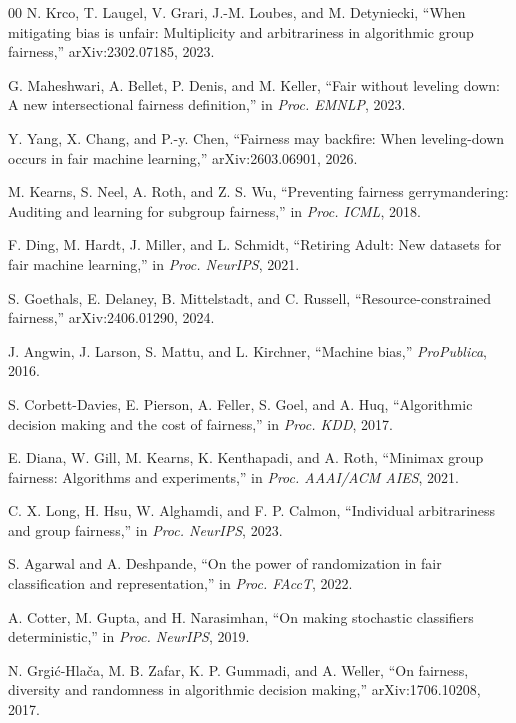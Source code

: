 \documentclass[conference]{IEEEtran}
\begin{document}
\begin{thebibliography}{00}
 N. Krco, T. Laugel, V. Grari, J.-M. Loubes, and M. Detyniecki, ``When
mitigating bias is unfair: Multiplicity and arbitrariness in algorithmic group fairness,''
arXiv:2302.07185, 2023.

 G. Maheshwari, A. Bellet, P. Denis, and M. Keller, ``Fair without
leveling down: A new intersectional fairness definition,'' in \emph{Proc. EMNLP}, 2023.

 Y. Yang, X. Chang, and P.-y. Chen, ``Fairness may backfire: When
leveling-down occurs in fair machine learning,'' arXiv:2603.06901, 2026.

 M. Kearns, S. Neel, A. Roth, and Z. S. Wu, ``Preventing fairness
gerrymandering: Auditing and learning for subgroup fairness,'' in \emph{Proc. ICML}, 2018.

 F. Ding, M. Hardt, J. Miller, and L. Schmidt, ``Retiring Adult: New datasets
for fair machine learning,'' in \emph{Proc. NeurIPS}, 2021.

 S. Goethals, E. Delaney, B. Mittelstadt, and C. Russell,
``Resource-constrained fairness,'' arXiv:2406.01290, 2024.

 J. Angwin, J. Larson, S. Mattu, and L. Kirchner, ``Machine bias,''
\emph{ProPublica}, 2016.

 S. Corbett-Davies, E. Pierson, A. Feller, S. Goel, and A. Huq,
``Algorithmic decision making and the cost of fairness,'' in \emph{Proc. KDD}, 2017.

 E. Diana, W. Gill, M. Kearns, K. Kenthapadi, and A. Roth, ``Minimax group
fairness: Algorithms and experiments,'' in \emph{Proc. AAAI/ACM AIES}, 2021.

 C. X. Long, H. Hsu, W. Alghamdi, and F. P. Calmon, ``Individual
arbitrariness and group fairness,'' in \emph{Proc. NeurIPS}, 2023.

 S. Agarwal and A. Deshpande, ``On the power of randomization in fair
classification and representation,'' in \emph{Proc. FAccT}, 2022.

 A. Cotter, M. Gupta, and H. Narasimhan, ``On making stochastic
classifiers deterministic,'' in \emph{Proc. NeurIPS}, 2019.

 N. Grgi\'{c}-Hla\v{c}a, M. B. Zafar, K. P. Gummadi, and A. Weller,
``On fairness, diversity and randomness in algorithmic decision making,''
arXiv:1706.10208, 2017.


\end{thebibliography}
\end{document}
